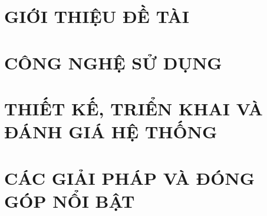 \documentclass[a4paper,13pt,3p,twoside]{report}
\theoremstyle{definition}
\begin{document}
\glsaddall 
 \renewcommand*{\glossaryname}{Danh sách thuật ngữ}
\renewcommand*{\acronymname}{DANH MỤC THUẬT NGỮ VÀ TỪ VIẾT TẮT}
\renewcommand*{\entryname}{Thuật ngữ}
\renewcommand*{\descriptionname}{Ý nghĩa}
\printnoidxglossaries

%  

% 


\newpage
{}

\pagestyle{fancy}
\fancyhf{}
\fancyhead[RE, LO]{\leftmark}
\fancyfoot[RE, LO]{\thepage}

\chapter{GIỚI THIỆU ĐỀ TÀI}
\label{chapter:Introduction}

% 


\newpage
\chapter{CÔNG NGHỆ SỬ DỤNG}
\label{chapter:Methodology}


\newpage
\chapter{THIẾT KẾ, TRIỂN KHAI VÀ ĐÁNH GIÁ HỆ THỐNG}
\label{chapter:Experiment}


\newpage
\chapter{CÁC GIẢI PHÁP VÀ ĐÓNG GÓP NỔI BẬT}
\label{chapter:SolutionAndContribution}

\newpage
\end{document}
